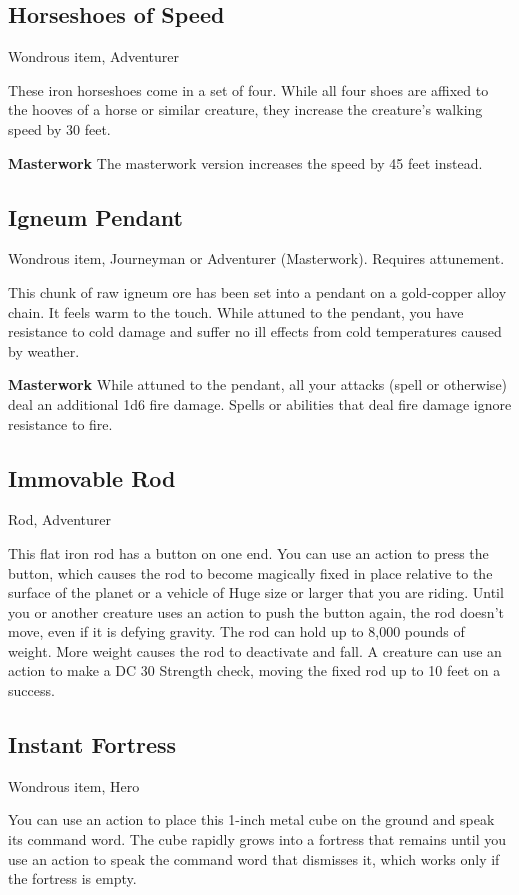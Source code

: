 \subsection{Horseshoes of Speed}
Wondrous item, Adventurer

These iron horseshoes come in a set of four. While all four shoes are affixed to the hooves of a horse or similar creature, they increase the creature's walking speed by 30 feet.

\textbf{Masterwork} The masterwork version increases the speed by 45 feet instead.

\subsection{Igneum Pendant}
Wondrous item, Journeyman or Adventurer (Masterwork). Requires attunement.

This chunk of raw igneum ore has been set into a pendant on a gold-copper alloy chain. It feels warm to the touch. While attuned to the pendant, you have resistance to cold damage and suffer no ill effects from cold temperatures caused by weather.

\textbf{Masterwork} While attuned to the pendant, all your attacks (spell or otherwise) deal an additional 1d6 fire damage. Spells or abilities that deal fire damage ignore resistance to fire.

\subsection{Immovable Rod}
Rod, Adventurer

This flat iron rod has a button on one end. You can use an action to press the button, which causes the rod to become magically fixed in place relative to the surface of the planet or a vehicle of Huge size or larger that you are riding. Until you or another creature uses an action to push the button again, the rod doesn't move, even if it is defying gravity. The rod can hold up to 8,000 pounds of weight. More weight causes the rod to deactivate and fall. A creature can use an action to make a DC 30 Strength check, moving the fixed rod up to 10 feet on a success.

\subsection{Instant Fortress}
Wondrous item, Hero

You can use an action to place this 1-inch metal cube on the ground and speak its command word. The cube rapidly grows into a fortress that remains until you use an action to speak the command word that dismisses it, which works only if the fortress is empty.

